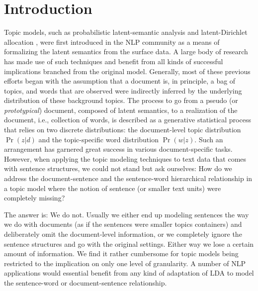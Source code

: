\begin{abstract}
\end{abstract}

\section{Introduction} \label{s:introduction}

Topic models, such as probabilistic latent-semantic analysis
\cite{hofmann1999probabilistic} and latent-Dirichlet allocation
\cite{blei2003latent}, were first introduced in the NLP community as a means of
formalizing the latent semantics from the surface data.  A large body of
research has made use of such techniques and benefit from all kinds of
successful implications branched from the original model.  Generally, most of
these previous efforts began with the assumption that a document is, in
principle, a bag of topics, and words that are observed were indirectly
inferred by the underlying distribution of these background topics.  The
process to go from a pseudo (or {\it prototypical}) document, composed of
latent semantics, to a realization of the document, i.e., collection of words,
is described as a generative statistical process that relies on two discrete
distributions: the document-level topic distribution $\Pr(z|d)$ and the
topic-specific word distribution $\Pr(w|z)$.  Such an arrangement has garnered
great success in various document-specific tasks.  However, when applying the
topic modeling techniques to text data that comes with sentence structures, we
could not stand but ask ourselves: How do we address the document-sentence and
the sentence-word hierarchical relationship in a topic model where the notion
of sentence (or smaller text units) were completely missing?  

The answer is: We do not.  Usually we either end up modeling sentences the way
we do with documents (as if the sentences were smaller topics containers) and
deliberately omit the document-level information, or we completely ignore the
sentence structures and go with the original settings.  Either way we lose a
certain amount of information.  We find it rather cumbersome for topic models
being restricted to the implication on only one level of granularity.  A number
of NLP applications would essential benefit from any kind of adaptation of LDA
to model the sentence-word or document-sentence relationship.

